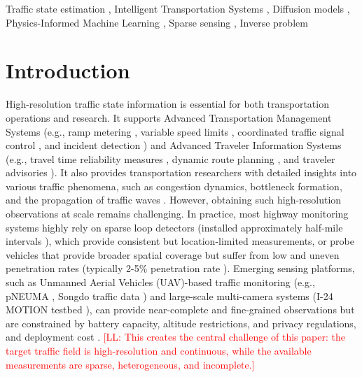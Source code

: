 \documentclass[a4paper,fleqn]{cas-sc}
\newcommand{\lindong}[1]{\textcolor{red}{[LL: #1]}}
\numberwithin{equation}{section}
\begin{document}
\begin{keywords}
Traffic state estimation \sep
Intelligent Transportation Systems \sep
Diffusion models \sep
Physics-Informed Machine Learning \sep
Sparse sensing \sep
Inverse problem
\end{keywords}

\maketitle
\section{Introduction}\label{sec:intro}
High-resolution traffic state information is essential for both transportation operations and research. It supports Advanced Transportation Management Systems (e.g., ramp metering \citep{belletti2017expert}, variable speed limits \citep{zhang2025real}, coordinated traffic signal control \citep{ahmed2019real}, and incident detection \citep{coursey2025real}) and Advanced Traveler Information Systems (e.g., travel time reliability measures \citep{liu2004uncovering}, dynamic route planning \citep{ahmed2016prediction}, and traveler advisories \citep{liebig2017dynamic, mori2015review}). It also provides transportation researchers with detailed insights into various traffic phenomena, such as congestion dynamics, bottleneck formation, and the propagation of traffic waves \citep{ji2026scalable}. However, obtaining such high-resolution observations at scale remains challenging. In practice, most highway monitoring systems highly rely on sparse loop detectors (installed approximately half-mile intervals \citep{liu2006detector, MnDOT2019ITS}), which provide consistent but location-limited measurements, or probe vehicles that provide broader spatial coverage but suffer from low and uneven penetration rates (typically 2-5\% penetration rate \citep{seo2017traffic,herrera2010evaluation}). Emerging sensing platforms, such as Unmanned Aerial Vehicles (UAV)-based traffic monitoring (e.g., pNEUMA \citep{barmpounakis2020new}, Songdo traffic data \citep{fonod2025advanced}) and large-scale multi-camera systems (I-24 MOTION testbed \citep{gloudemans202324}), can provide near-complete and fine-grained observations but are constrained by battery capacity, altitude restrictions, and privacy regulations, and deployment cost \citep{butilua2022urban}. \lindong{This creates the central challenge of this paper: the target traffic field is high-resolution and continuous, while the available measurements are sparse, heterogeneous, and incomplete.}
\end{document}
